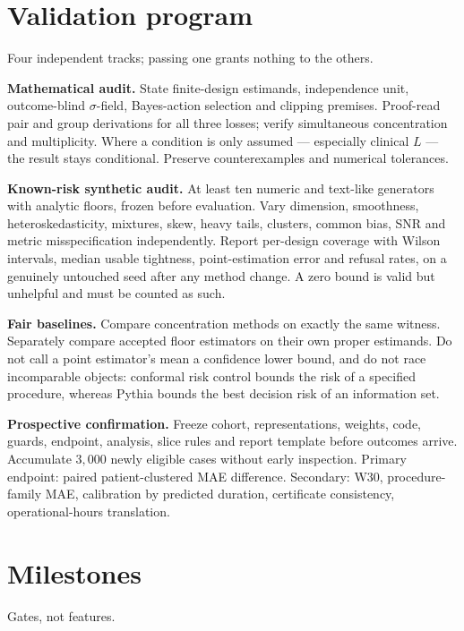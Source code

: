 \documentclass[11pt,a4paper]{article}
\theoremstyle{definition}
\theoremstyle{remark}
\newcommand{\tier}[1]{\textsf{#1}}
\begin{document}
\section{Validation program}\label{sec:validation}

Four independent tracks; passing one grants nothing to the others.

\textbf{Mathematical audit.} State finite-design estimands, independence unit, outcome-blind $\sigma$-field, Bayes-action selection and clipping premises. Proof-read pair and group derivations for all three losses; verify simultaneous concentration and multiplicity. Where a condition is only assumed --- especially clinical $L$ --- the result stays \tier{conditional}. Preserve counterexamples and numerical tolerances.

\textbf{Known-risk synthetic audit.} At least ten numeric and text-like generators with analytic floors, frozen before evaluation. Vary dimension, smoothness, heteroskedasticity, mixtures, skew, heavy tails, clusters, common bias, SNR and metric misspecification independently. Report per-design coverage with Wilson intervals, median usable tightness, point-estimation error and refusal rates, on a genuinely untouched seed after any method change. A zero bound is valid but unhelpful and must be counted as such.

\textbf{Fair baselines.} Compare concentration methods on exactly the same witness. Separately compare accepted floor estimators on their own proper estimands. Do not call a point estimator's mean a confidence lower bound, and do not race incomparable objects: conformal risk control bounds the risk of a specified procedure, whereas Pythia bounds the best decision risk of an information set.

\textbf{Prospective confirmation.} Freeze cohort, representations, weights, code, guards, endpoint, analysis, slice rules and report template before outcomes arrive. Accumulate $3{,}000$ newly eligible cases without early inspection. Primary endpoint: paired patient-clustered MAE difference. Secondary: W30, procedure-family MAE, calibration by predicted duration, certificate consistency, operational-hours translation.

\section{Milestones}\label{sec:milestones}

Gates, not features.
\end{document}
